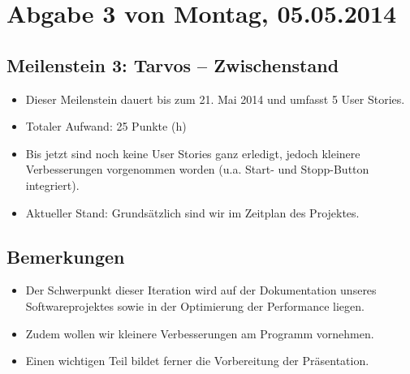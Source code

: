 \newpage


\vspace*{1cm}


\section*{Abgabe 3 von Montag, 05.05.2014}


\subsection*{Meilenstein 3: Tarvos – Zwischenstand}

\begin{itemize}[noitemsep]
\item Dieser Meilenstein dauert bis zum 21. Mai 2014 und umfasst 5 User Stories.
\item Totaler Aufwand: 25 Punkte (h)
\item Bis jetzt sind noch keine User Stories ganz erledigt, jedoch kleinere Verbesserungen vorgenommen worden (u.a. Start- und Stopp-Button integriert).
\item Aktueller Stand: Grundsätzlich sind wir im Zeitplan des Projektes.
\end{itemize}




\subsection*{Bemerkungen}

\begin{itemize}[noitemsep]
\item Der Schwerpunkt dieser Iteration wird auf der Dokumentation unseres Softwareprojektes sowie in der Optimierung der Performance liegen. 
\item Zudem wollen wir kleinere Verbesserungen am Programm vornehmen.
\item Einen wichtigen Teil bildet ferner die Vorbereitung der Präsentation.
\end{itemize}


